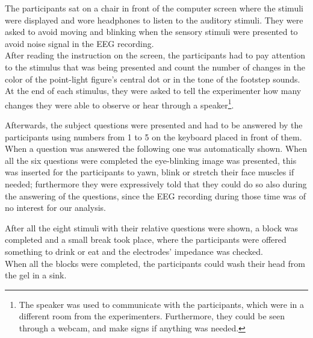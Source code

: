 The participants sat on a chair in front of the computer screen where the stimuli were displayed and wore headphones to listen to the auditory stimuli. They were asked to avoid moving and blinking when the sensory stimuli were presented to avoid noise signal in the EEG recording. \\
After reading the instruction on the screen, the participants had to pay attention to the stimulus that was being presented and count the number of changes in the color of the point-light figure's central dot or in the tone of the footstep sounds. At the end of each stimulus, they were asked to tell the experimenter how many changes they were able to observe or hear through a speaker\footnote{The speaker was used to communicate with the participants, which were in a different room from the experimenters. Furthermore, they could be seen through a webcam, and make signs if anything was needed.}. 

Afterwards, the subject questions were presented and had to be answered by the participants using numbers from 1 to 5 on the keyboard placed in front of them. When a question was answered the following one was automatically shown. When all the six questions were completed the eye-blinking image was presented, this was inserted for the participants to yawn, blink or stretch their face muscles if needed; furthermore they were expressively told that they could do so also during the answering of the questions, since the EEG recording during those time was of no interest for our analysis.  

After all the eight stimuli with their relative questions were shown, a block was completed and a small break took place, where the participants were offered something to drink or eat and the electrodes' impedance was checked. \\
When all the blocks were completed, the participants could wash their head from the gel in a sink.

